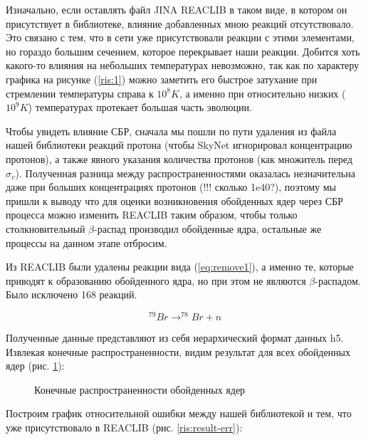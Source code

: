 \documentclass[%
master,    %
natbib,      %
subf,        %
href,        %
colorlinks,  %
]{disser}
\begin{document}
Изначально, если оставлять файл JINA REACLIB в таком виде, в котором он присутствует в библиотеке, влияние добавленных мною реакций отсутствовало. Это связано с тем, что в сети уже присутствовали реакции с этими элементами, но гораздо большим сечением, которое перекрывает наши реакции. Добится хоть какого-то влияния на небольших температурах невозможно, так как по характеру графика на рисунке (\ref{ris:1}) можно заметить его быстрое затухание при стремлении температуры справа к $10^8 K$, а именно при относительно низких ($10^9 K$) температурах протекает большая часть эволюции.

Чтобы увидеть влияние СБР, сначала мы пошли по пути удаления из файла нашей библиотеки реакций протона (чтобы SkyNet игнорировал концентрацию протонов), а также явного указания количества протонов (как множитель перед $\sigma_v$). Полученная разница между распространенностями оказалась незначительна даже при больших концентрациях протонов (!!! сколько 1e40?), поэтому мы пришли к выводу что для оценки возникновения обойденных ядер через СБР процесса можно изменить REACLIB таким образом, чтобы только столкновительный $\beta$-распад производил обойденные ядра, остальные же процессы на данном этапе отбросим.

Из REACLIB были удалены реакции вида (\ref{eq:remove1}), а именно те, которые приводят к образованию обойденного ядра, но при этом не являются $\beta$-распадом. Было исключено 168 реакций.

\begin{equation}
\label{eq:remove1}
	^{79}Br \to ^{78}Br + n
\end{equation}

Полученные данные представляют из себя иерархический формат данных h5. Извлекая конечные распространенности, видим результат для всех обойденных ядер (рис. \ref{ris:result}):

\begin{figure}[h]
	\caption{Конечные распространенности обойденных ядер}
	\label{ris:result}
\end{figure}

Построим график относительной ошибки между нашей библиотекой и тем, что уже присутствовало в REACLIB (рис. \ref{ris:result-err}):
\end{document}
